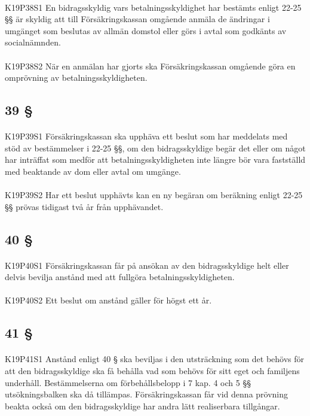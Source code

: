\documentclass[a4paper,notitlepage,openany,10pt]{book}
\begin{document}
\paragraph*{}
{\tiny K19P38S1}
En bidragsskyldig vars betalningsskyldighet har bestämts enligt 22-25 §§ är skyldig att till Försäkringskassan omgående anmäla de ändringar i umgänget som beslutas av allmän domstol eller görs i avtal som godkänts av socialnämnden.
\paragraph*{}
{\tiny K19P38S2}
När en anmälan har gjorts ska Försäkringskassan omgående göra en omprövning av betalningsskyldigheten.
\subsection*{39 §}
\paragraph*{}
{\tiny K19P39S1}
Försäkringskassan ska upphäva ett beslut som har meddelats med stöd av bestämmelser i 22-25 §§, om den bidragsskyldige begär det eller om något har inträffat som medför att betalningsskyldigheten inte längre bör vara fastställd med beaktande av dom eller avtal om umgänge.
\paragraph*{}
{\tiny K19P39S2}
Har ett beslut upphävts kan en ny begäran om beräkning enligt 22-25 §§ prövas tidigast två år från upphävandet.
\subsection*{40 §}
\paragraph*{}
{\tiny K19P40S1}
Försäkringskassan får på ansökan av den bidragsskyldige helt eller delvis bevilja anstånd med att fullgöra betalningsskyldigheten.
\paragraph*{}
{\tiny K19P40S2}
Ett beslut om anstånd gäller för högst ett år.
\subsection*{41 §}
\paragraph*{}
{\tiny K19P41S1}
Anstånd enligt 40 § ska beviljas i den utsträckning som det behövs för att den bidragsskyldige ska få behålla vad som behövs för sitt eget och familjens underhåll. Bestämmelserna om förbehållsbelopp i 7 kap. 4 och 5 §§ utsökningsbalken ska då tillämpas. Försäkringskassan får vid denna prövning beakta också om den bidragsskyldige har andra lätt realiserbara tillgångar.
\end{document}
